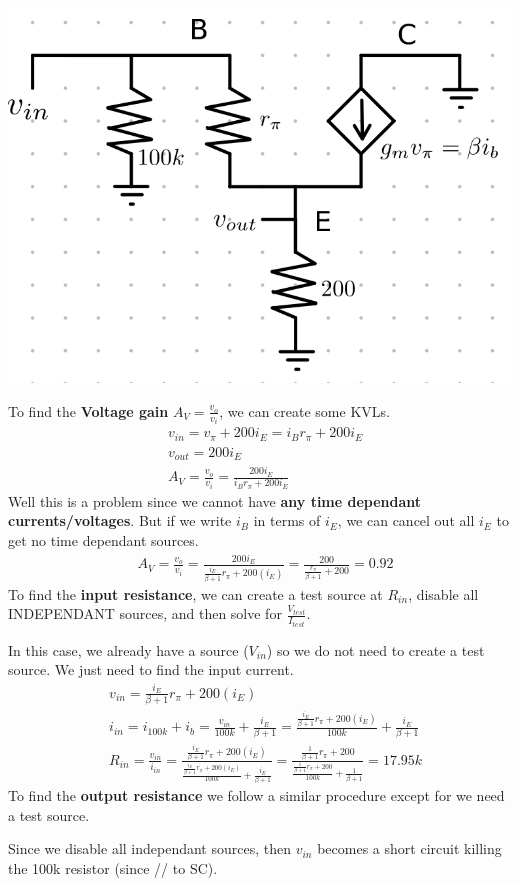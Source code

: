 \documentclass[12pt,letterpaper]{article} \usepackage{amsmath} \usepackage{graphicx} \usepackage[margin=1in]{geometry} \usepackage{longtable}  \usepackage{amssymb}
\begin{document}
\begin{mdframed}
		\begin{center}
			\includegraphics[width=0.4\linewidth]{bjt-ex2}
		\end{center}
		To find the \textbf{Voltage gain} $A_V = \frac{v_o}{v_i}$, we can create some KVLs.
		\begin{align*}
			&v_{in} = v_\pi + 200i_E = i_B r_\pi + 200i_E\\
			&v_{out} = 200i_E\\
			&A_V = \frac{v_o}{v_i} = \frac{200i_E}{i_Br_\pi+200i_E}
		\end{align*}
		Well this is a problem since we cannot have \textbf{any time dependant currents/voltages}. But if we write $i_B$ in terms of $i_E$, we can cancel out all $i_E$ to get no time dependant sources.
		\begin{align*}
			&A_V = \frac{v_o}{v_i} = \frac{200i_E}{\frac{i_E}{\beta +1}r_\pi+200(i_E)} = \frac{200}{\frac{r_\pi}{\beta +1}+200} = 0.92
		\end{align*}
		To find the \textbf{input resistance}, we can create a test source at $R_{in}$, disable all INDEPENDANT sources, and then solve for $\frac{V_{test}}{I_{test}}$. 
		
		In this case, we already have a source ($V_{in}$) so we do not need to create a test source. We just need to find the input current. 
		\begin{align*}
			&v_{in} = \frac{i_E}{\beta +1}r_\pi+200(i_E)\\
			&i_{in} = i_{100k} + i_b = \frac{v_{in}}{100k} + \frac{i_E}{\beta + 1} = \frac{\frac{i_E}{\beta +1}r_\pi+200(i_E)}{100k} + \frac{i_E}{\beta + 1}\\
			&R_{in} = \frac{v_{in}}{i_{in}} = \frac{\frac{i_E}{\beta +1}r_\pi+200(i_E)}{\frac{\frac{i_E}{\beta +1}r_\pi+200(i_E)}{100k} + \frac{i_E}{\beta + 1}} = \frac{\frac{1}{\beta +1}r_\pi+200}{\frac{\frac{1}{\beta +1}r_\pi+200}{100k} + \frac{1}{\beta + 1}} = 17.95k
		\end{align*}
		To find the \textbf{output resistance} we follow a similar procedure except for we need a test source. 
		
		Since we disable all independant sources, then $v_{in}$ becomes a short circuit killing the 100k resistor (since // to SC).
		

\end{mdframed}
\end{document}
